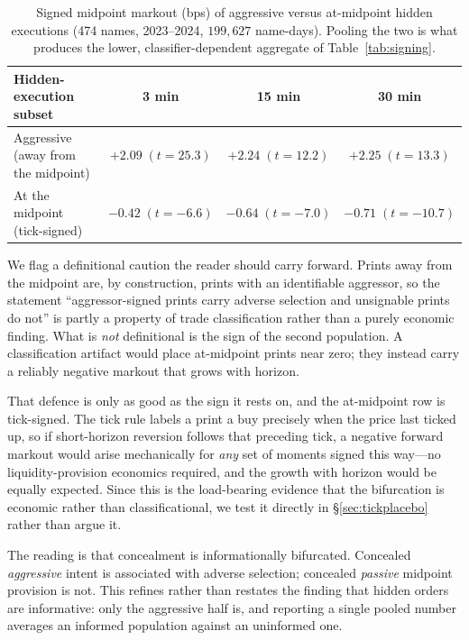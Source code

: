 \documentclass[11pt]{article}
\begin{document}
\begin{table}[htbp]
\centering
\begin{tabular}{lccc}
\toprule
\textbf{Hidden-execution subset} & \textbf{3 min} & \textbf{15 min} & \textbf{30 min} \\
\midrule
Aggressive (away from the midpoint) & $+2.09\;(t{=}25.3)$ & $+2.24\;(t{=}12.2)$ & $+2.25\;(t{=}13.3)$ \\
At the midpoint (tick-signed) & $-0.42\;(t{=}{-}6.6)$ & $-0.64\;(t{=}{-}7.0)$ & $-0.71\;(t{=}{-}10.7)$ \\
\bottomrule
\end{tabular}
\caption{Signed midpoint markout (bps) of aggressive versus at-midpoint hidden executions
(474 names, 2023--2024, $199{,}627$ name-days). Pooling the two is what produces the lower,
classifier-dependent aggregate of Table~\ref{tab:signing}.}
\label{tab:decomp}
\end{table}

We flag a definitional caution the reader should carry forward. Prints away from the
midpoint are, by construction, prints with an identifiable aggressor, so the statement
``aggressor-signed prints carry adverse selection and unsignable prints do not'' is partly a
property of trade classification rather than a purely economic finding. What is \emph{not}
definitional is the sign of the second population. A classification artifact would place
at-midpoint prints near zero; they instead carry a reliably negative markout that grows with
horizon.

That defence is only as good as the sign it rests on, and the at-midpoint row is tick-signed.
The tick rule labels a print a buy precisely when the price last ticked up, so if
short-horizon reversion follows that preceding tick, a negative forward markout would arise
mechanically for \emph{any} set of moments signed this way---no liquidity-provision
economics required, and the growth with horizon would be equally expected. Since this is the
load-bearing evidence that the bifurcation is economic rather than classificational, we test
it directly in \S\ref{sec:tickplacebo} rather than argue it.

The reading is that concealment is informationally bifurcated. Concealed \emph{aggressive}
intent is associated with adverse selection; concealed \emph{passive} midpoint provision is
not. This refines rather than restates the finding that hidden orders are informative: only
the aggressive half is, and reporting a single pooled number averages an informed
population against an uninformed one.
\end{document}

